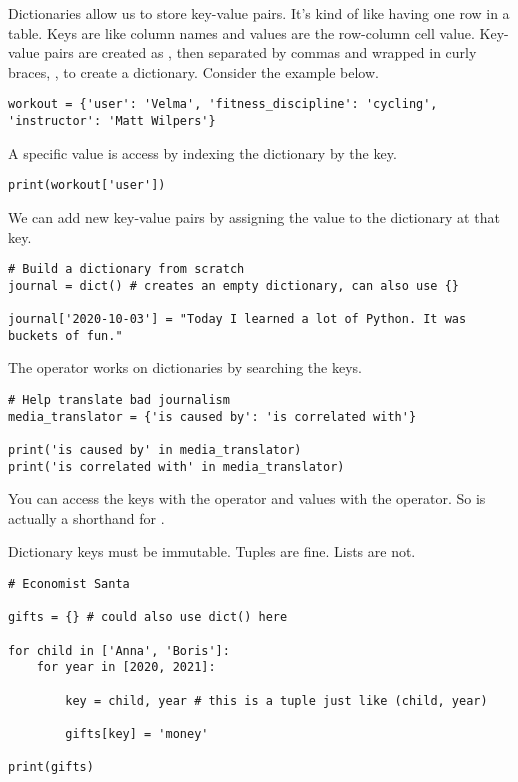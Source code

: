 Dictionaries allow us to store key-value pairs. It's kind of like having one row in a table. Keys are like column names and values are the row-column cell value. Key-value pairs are created as , then separated by commas and wrapped in curly braces, \code{\{\}}, to create a dictionary. Consider the example below.

\begin{lstlisting}
workout = {'user': 'Velma', 'fitness_discipline': 'cycling', 'instructor': 'Matt Wilpers'}
\end{lstlisting}

A specific value is access by indexing the dictionary by the key. 

\begin{lstlisting}
print(workout['user'])
\end{lstlisting}

\smallskip
We can add new key-value pairs by assigning the value to the dictionary at that key. 

\begin{lstlisting}
# Build a dictionary from scratch
journal = dict() # creates an empty dictionary, can also use {}

journal['2020-10-03'] = "Today I learned a lot of Python. It was buckets of fun."
\end{lstlisting}

\smallskip
\noindent The  operator works on dictionaries by searching the keys. 

\begin{lstlisting}
# Help translate bad journalism
media_translator = {'is caused by': 'is correlated with'}

print('is caused by' in media_translator)
print('is correlated with' in media_translator)
\end{lstlisting}


You can access the keys with the  operator and values with the  operator. So  is actually a shorthand for .

\smallskip

\noindent Dictionary keys must be immutable. Tuples are fine. Lists are not. 

\begin{lstlisting}
# Economist Santa

gifts = {} # could also use dict() here 

for child in ['Anna', 'Boris']:
    for year in [2020, 2021]:
        
        key = child, year # this is a tuple just like (child, year)
        
        gifts[key] = 'money'
        
print(gifts)
\end{lstlisting}




